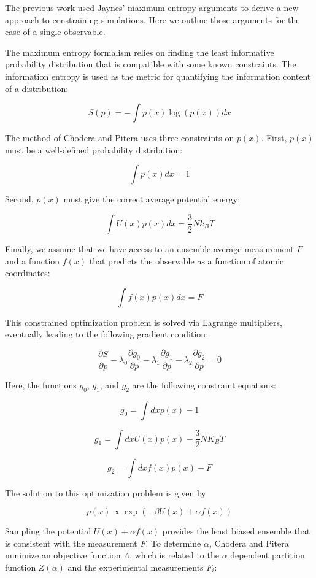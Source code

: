 \documentclass[12pt]{article}
\begin{document}
The previous work \cite{chodera2012} used Jaynes' maximum entropy arguments \cite{jaynes1957information} to derive a new approach to constraining simulations.  Here we outline those arguments for the case of a single observable.  

The maximum entropy formalism relies on finding the least informative probability distribution that is compatible with some known constraints.  The information entropy is used as the metric for quantifying the information content of a distribution:

$$S(p) = - \int p(x) \log(p(x)) dx $$

The method of Chodera and Pitera uses three constraints on $p(x)$.  First, $p(x)$ must be a well-defined probability distribution:

$$\int p(x) dx = 1 $$

Second, $p(x)$ must give the correct average potential energy:

$$\int U(x) p(x) dx = \frac{3}{2} N k_B T$$

Finally, we assume that we have access to an ensemble-average measurement $F$ and a function $f(x)$ that predicts the observable as a function of atomic coordinates:

$$\int f(x) p(x) dx = F$$

This constrained optimization problem is solved via Lagrange multipliers, eventually leading to the following gradient condition:

$$\frac{\partial S}{\partial p} - \lambda_0 \frac{\partial g_0}{\partial p}- \lambda_1 \frac{\partial g_1}{\partial p}- \lambda_2 \frac{\partial g_2}{\partial p} = 0$$

Here, the functions $g_0$, $g_1$, and $g_2$ are the following constraint equations:

$$g_0 = \int dx p(x) - 1$$

$$g_1 = \int dx U(x) p(x) - \frac{3}{2} N K_B T$$

$$g_2 = \int dx f(x) p(x) - F$$

The solution to this optimization problem is given by 

$$p(x) \propto \exp(-\beta U(x) + \alpha f(x))$$

Sampling the potential $U(x) + \alpha f(x)$ provides the least biased ensemble that is consistent with the measurement $F$.  To determine $\alpha$, Chodera and Pitera minimize an objective function $\Lambda$, which is related to the $\alpha$ dependent partition function $Z(\alpha)$ and the experimental measurements $F_i$:
\end{document}
